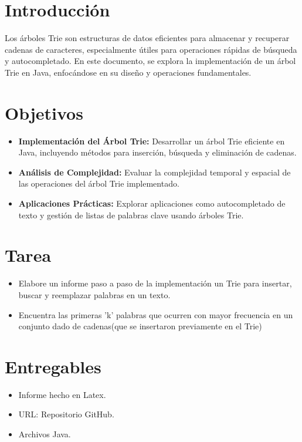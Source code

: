 \documentclass{article}
\begin{document}
  \section{Introducción}
  Los árboles Trie son estructuras de datos eficientes para almacenar y recuperar cadenas de caracteres, 
  especialmente útiles para operaciones rápidas de búsqueda y autocompletado. En este documento, se explora la 
  implementación de un árbol Trie en Java, enfocándose en su diseño y operaciones fundamentales.


  \section{Objetivos}
  \begin{itemize}
  \item \textbf{Implementación del Árbol Trie:} Desarrollar un árbol Trie eficiente en Java, incluyendo métodos para inserción, 
  búsqueda y eliminación de cadenas.
  \item \textbf{Análisis de Complejidad:} Evaluar la complejidad temporal y espacial de las operaciones del árbol Trie implementado.
  \item \textbf{Aplicaciones Prácticas:} Explorar aplicaciones como autocompletado de texto y gestión de listas de palabras clave usando 
  árboles Trie.
  \end{itemize}

 
	\section{Tarea}
  \begin{itemize}
    \item Elabore un informe paso a paso de la implementación un Trie para insertar, buscar y reemplazar palabras en un texto.
    \item Encuentra las primeras 'k' palabras que ocurren con mayor frecuencia en un conjunto dado de cadenas(que se insertaron previamente en el Trie)
  \end{itemize}
 
 
  \section{Entregables}
  \begin{itemize}
    \item Informe hecho en Latex.
    \item URL: Repositorio GitHub.
    \item Archivos Java. 
  \end{itemize}
  
\end{document}
